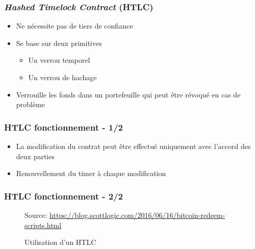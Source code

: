 
\begin{frame}
	\frametitle{\textit{Hashed Timelock Contract} (HTLC)}
	\begin{itemize}
		\item Ne nécessite pas de tiers de confiance
		\item Se base sur deux primitives
		      \begin{itemize}
			      \item Un verrou temporel
			      \item Un verrou de hachage
		      \end{itemize}
		\item Verrouille les fonds dans un portefeuille qui peut être révoqué en cas de problème
	\end{itemize}
\end{frame}

\begin{frame}
	\frametitle{HTLC fonctionnement - 1/2}
	\begin{itemize}
		\item La modification du contrat peut être effectué uniquement avec l'accord des deux parties
		\item Renouvellement du timer à chaque modification
	\end{itemize}
\end{frame}

\begin{frame}
	\frametitle{HTLC fonctionnement - 2/2}

	\begin{figure}[h!]

		{\scriptsize
			Source: \url{https://blog.scottlogic.com/2016/06/16/bitcoin-redeem-scripts.html}}
		\caption[short]{Utilisation d'un HTLC}
	\end{figure}

\end{frame}

